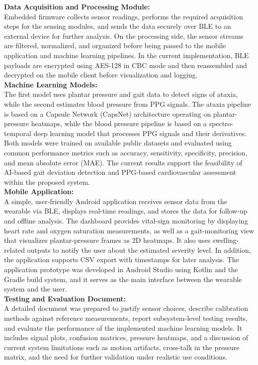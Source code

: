 \textbf{Data Acquisition and Processing Module:}\\
Embedded firmware collects sensor readings, performs the required acquisition steps for the sensing modules, and sends the data securely over BLE to an external device for further analysis. On the processing side, the sensor streams are filtered, normalized, and organized before being passed to the mobile application and machine learning pipelines. In the current implementation, BLE payloads are encrypted using AES-128 in CBC mode and then reassembled and decrypted on the mobile client before visualization and logging.\\

\textbf{Machine Learning Models:}\\
The first model uses plantar pressure and gait data to detect signs of ataxia, while the second estimates blood pressure from PPG signals. The ataxia pipeline is based on a Capsule Network (CapsNet) architecture operating on plantar-pressure heatmaps, while the blood pressure pipeline is based on a spectro-temporal deep learning model that processes PPG signals and their derivatives. Both models were trained on available public datasets and evaluated using common performance metrics such as accuracy, sensitivity, specificity, precision, and mean absolute error (MAE). The current results support the feasibility of AI-based gait deviation detection and PPG-based cardiovascular assessment within the proposed system.\\

\textbf{Mobile Application:}\\ 
A simple, user-friendly Android application receives sensor data from the wearable via BLE, displays real-time readings, and stores the data for follow-up and offline analysis. The dashboard provides vital-sign monitoring by displaying heart rate and oxygen saturation measurements, as well as a gait-monitoring view that visualizes plantar-pressure frames as 2D heatmaps. It also uses swelling-related outputs to notify the user about the estimated severity level. In addition, the application supports CSV export with timestamps for later analysis. The application prototype was developed in Android Studio using Kotlin and the Gradle build system, and it serves as the main interface between the wearable system and the user.\\

\textbf{Testing and Evaluation Document:}\\ 
A detailed document was prepared to justify sensor choices, describe calibration methods against reference measurements, report subsystem-level testing results, and evaluate the performance of the implemented machine learning models. It includes signal plots, confusion matrices, pressure heatmaps, and a discussion of current system limitations such as motion artifacts, cross-talk in the pressure matrix, and the need for further validation under realistic use conditions.\\

